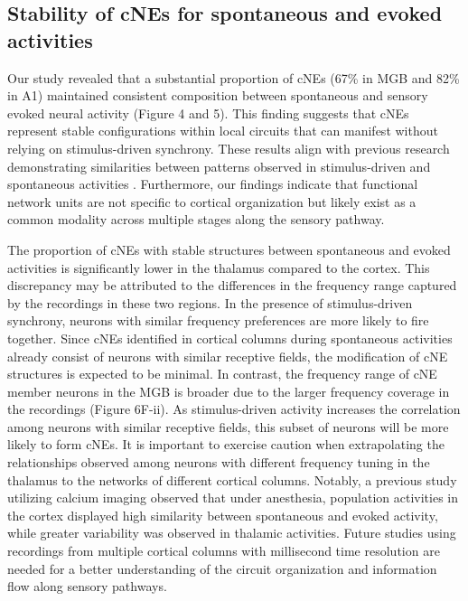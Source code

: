 \documentclass[11pt]{article}
\begin{document}
\subsection*{Stability of cNEs for spontaneous and evoked activities}
Our study revealed that a substantial proportion of cNEs (67\% in MGB and 82\% in A1) maintained consistent composition between spontaneous and sensory evoked neural activity (Figure 4 and 5). This finding suggests that cNEs represent stable configurations within local circuits that can manifest without relying on stimulus-driven synchrony. These results align with previous research demonstrating similarities between patterns observed in stimulus-driven and spontaneous activities \citep{luczak2009spontaneous}. Furthermore, our findings indicate that functional network units are not specific to cortical organization but likely exist as a common modality across multiple stages along the sensory pathway.

The proportion of cNEs with stable structures between spontaneous and evoked activities is significantly lower in the thalamus compared to the cortex. This discrepancy may be attributed to the differences in the frequency range captured by the recordings in these two regions. In the presence of stimulus-driven synchrony, neurons with similar frequency preferences are more likely to fire together. Since cNEs identified in cortical columns during spontaneous activities already consist of neurons with similar receptive fields, the modification of cNE structures is expected to be minimal. In contrast, the frequency range of cNE member neurons in the MGB is broader due to the larger frequency coverage in the recordings (Figure 6F-ii). As stimulus-driven activity increases the correlation among neurons with similar receptive fields, this subset of neurons will be more likely to form cNEs. It is important to exercise caution when extrapolating the relationships observed among neurons with different frequency tuning in the thalamus to the networks of different cortical columns. Notably, a previous study utilizing calcium imaging \citep{Filipchuk2022} observed that under anesthesia, population activities in the cortex displayed high similarity between spontaneous and evoked activity, while greater variability was observed in thalamic activities. Future studies using recordings from multiple cortical columns with millisecond time resolution are needed for a better understanding of the circuit organization and information flow along sensory pathways.
\end{document}
